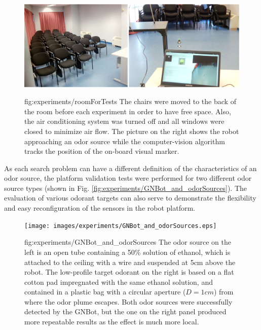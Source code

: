 \begin{figure}[h!]
\centerline{\mbox{\includegraphics[width=16cm]{images/experiments/roomForTests.eps}}}
{fig:experiments/roomForTests}{
The chairs were moved to the back of the room before each experiment in order to have free space. Also, the air conditioning system was turned off and all windows were closed to minimize air flow. The picture on the right shows the robot approaching an odor source while the computer-vision algorithm tracks the position of the on-board visual marker.
}
\end{figure}


As each search problem can have a different definition of the characteristics of an odor source, the platform validation tests were performed for two different odor source types (shown in Fig. \ref{fig:experiments/GNBot_and_odorSources}). The evaluation of various odorant targets can also serve to demonstrate the flexibility and easy reconfiguration of the sensors in the robot platform.




\begin{figure}[h!]
\centerline{\mbox{\texttt{[image: images/experiments/GNBot\_and\_odorSources.eps]}}}
{fig:experiments/GNBot_and_odorSources}{
The odor source on the left is an open tube containing a 50\% solution of ethanol, which is attached to the ceiling with a wire and suspended at 5cm above the robot. The low-profile target odorant on the right is based on a flat cotton pad impregnated with the same ethanol solution, and contained in a plastic bag with a circular aperture ($D=1cm$) from where the odor plume escapes.
Both odor sources were successfully detected by the GNBot, but the one on the right panel produced more repeatable results as the effect is much more local.
}
\end{figure}








